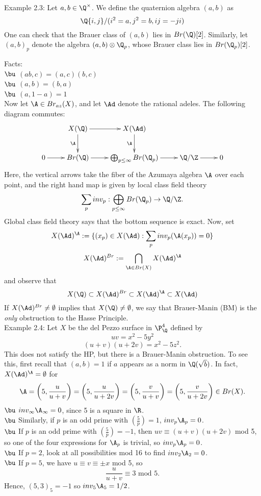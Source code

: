 \documentclass[11pt]{amsart}
\numberwithin{equation}{section}
\numberwithin{subsection}{section}
\theoremstyle{definition}
\theoremstyle{remark}
\begin{document}
Example 2.3:  Let $a,b\in \Q^\times$.  We define the quaternion algebra $(a,b)$ as
$$\Q\{i,j\}/(i^2=a, j^2=b, ij=-ji)$$
One can check that the Brauer class of $(a,b)$ lies in $Br(\Q)[2]$.  Similarly, let $(a,b)_p$ denote the algebra $(a,b)\otimes \Q_p$, whose Brauer class lies in $Br(\Q_p)[2]$.  

Facts:\\
$\bu$ $(ab,c)=(a,c)(b,c)$\\
$\bu$ $(a,b)=(b,a)$\\
$\bu$ $(a,1-a)=1$\\

Now let $\A\in Br_{az}(X)$, and let $\Ad$ denote the rational adeles.  The following diagram commutes:
$$\xymatrix{
{} & X(\Q) \ar[d]_{\A}\ar[r] &X(\Ad) \ar[d]_{\A} & {}& {} \\
0 \ar[r] & Br(\Q)\ar[r] & \bigoplus_{p\leq\infty} Br(\Q_p) \ar[r] & \Q/\Z \ar[r] & 0
}$$
Here, the vertical arrows take the fiber of the Azumaya algebra $\A$ over each point, and the right hand map is given by local class field theory
$$\sum_p inv_p :  \bigoplus_{p\leq\infty} Br(\Q_p) \to  \Q/\Z.$$
Global class field theory says that the bottom sequence is exact.  Now, set
$$X(\Ad)^\A := \{(x_p)\in X(\Ad): \sum_p inv_p(\A(x_p))=0\}$$
$$X(\Ad)^{Br} := \bigcap_{\A\in Br(X)} X(\Ad)^\A$$
and observe that
$$X(\Q)\subset X(\Ad)^{Br}\subset X(\Ad)^\A\subset X(\Ad)$$
If $X(\Ad)^{Br}\neq\emptyset$ implies that $X(\Q)\neq\emptyset$, we say that Brauer-Manin (BM) is the {\it only} obstruction to the Hasse Principle.\\

Example 2.4:  Let $X$ be the del Pezzo surface in $\P^4_\Q$ defined by 
$$uv = x^2-5y^2$$
$$(u+v)(u+2v)=x^2-5z^2.$$
This does not satisfy the HP, but there is a Brauer-Manin obstruction.  To see this, first recall that $(a,b)=1$ if $a$ appears as a norm in $\Q(\sqrt{b})$.  In fact, $X(\Ad)^\A=\emptyset$ for 
$$\A=\left(5,\frac{u}{u+v}\right) = \left(5,\frac{u}{u+2v}\right) = \left(5,\frac{v}{u+v}\right) =\left (5,\frac{v}{u+2v}\right)\in Br(X).$$
$\bu$ $inv_{\infty} \A_\infty=0$, since 5 is a square in $\R$.\\
$\bu$ Similarly, if $p$ is an odd prime with $(\frac{5}{p})=1$, $inv_p \A_p=0$.\\
$\bu$ If $p$ is an odd prime with $(\frac{5}{p})=-1$, then $uv \equiv (u+v)(u+2v)$ mod 5, so one of the four expressions for $\A_p$ is trivial, so $inv_p\A_p=0$.\\
$\bu$ If $p=2$, look at all possibilities mod 16 to find $inv_2 \A_2=0$.\\
$\bu$ If $p=5$, we have $u\equiv v\equiv \pm x$ mod 5, so
$$\frac{u}{u+v}\equiv 3\text{ mod 5}.$$
Hence, $(5,3)_5=-1$ so $inv_5 \A_5=1/2$.\\
\end{document}

